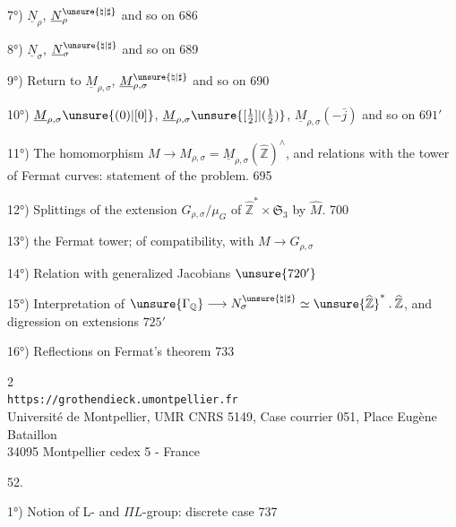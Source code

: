 7°) $\underline N_\rho$, $\underline N_\rho^{\unsure{\natural|\sharp}}$ and so on \hfill 686

8°) $\underline N_\sigma$, $\underline N_\sigma^{\unsure{\natural|\sharp}}$ and so on \hfill 689

9°) Return to $\underline M_{\rho,\sigma}$, $\underline M_{\rho,\sigma}^{\unsure{\natural|\sharp}}$ and so on \hfill 690

10°) $\underline M_{\rho,\sigma}\unsure{(0)|[0]}$, $\underline M_{\rho,\sigma}\unsure{[\tfrac12]|(\tfrac12)}$, $\underline M_{\rho,\sigma}(-\bar j)$ and so on \hfill $691'$

11°) The homomorphism $M\longrightarrow M_{\rho,\sigma}=\underline M_{\rho,\sigma}(\widehat{\mathbb Z})^{\wedge}$, and relations with the tower of Fermat curves: statement of the problem. \hfill 695

12°) Splittings of the extension $G_{\rho,\sigma}/\mu_G$ of $\widehat{\mathbb Z}^{*}\times\mathfrak S_3$ by $\widehat M$. \hfill 700

13°)  the Fermat tower;   of compatibility, with $M\longrightarrow G_{\rho,\sigma}$ \hfill {}

14°) Relation with generalized Jacobians \hfill $\unsure{720'}$

15°) Interpretation of $\unsure{\Gamma_{\mathbb Q}}\longrightarrow N_\sigma^{\unsure{\natural|\sharp}}\simeq\unsure{\widehat{\mathbb Z}}^{*}\mathbin{.}\widehat{\mathbb Z}$, and digression on  extensions \hfill $725'$

16°) Reflections on Fermat's theorem \hfill 733


\begin{center}
\small
2\\
\texttt{https://grothendieck.umontpellier.fr}\\
Université de Montpellier, UMR CNRS 5149, Case courrier 051, Place Eugène Bataillon\\
34095 Montpellier cedex 5 - France
\end{center}

52. 

1°) Notion of L- and $\Pi L$-group: discrete case \hfill 737

